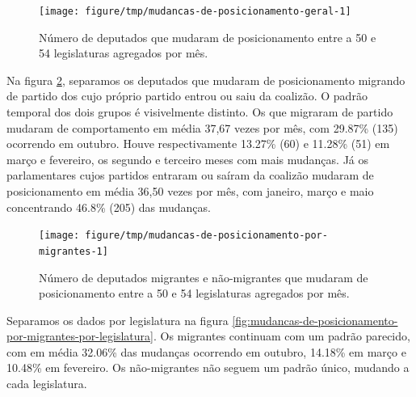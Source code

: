 \documentclass[a4paper,titlepage]{ppgi}\usepackage[]{graphicx}\usepackage[]{color}
\newenvironment{knitrout}{}{} %
\begin{document}
\begin{knitrout}
\color{fgcolor}\begin{figure}
\texttt{[image: figure/tmp/mudancas-de-posicionamento-geral-1]} \caption[Número de deputados que mudaram de posicionamento entre a 50\textordfeminine{} e 54\textordfeminine{} legislaturas agregados por mês]{Número de deputados que mudaram de posicionamento entre a 50\textordfeminine{} e 54\textordfeminine{} legislaturas agregados por mês.}\label{fig:mudancas-de-posicionamento-geral}
\end{figure}


\end{knitrout}

Na figura \ref{fig:mudancas-de-posicionamento-por-migrantes}, separamos os
deputados que mudaram de posicionamento migrando de partido dos cujo próprio
partido entrou ou saiu da coalizão. O padrão temporal dos dois grupos é
visivelmente distinto. Os que migraram de partido mudaram de comportamento em
média 37,67 vezes por mês, com
29.87\%
(135) ocorrendo em outubro. Houve respectivamente
13.27\%
(60) e
11.28\%
(51) em março e fevereiro, os segundo e terceiro
meses com mais mudanças. Já os parlamentares cujos partidos entraram ou saíram
da coalizão mudaram de posicionamento em média
36,50 vezes por mês, com janeiro, março e
maio concentrando
46.8\%
(205) das mudanças.

\begin{knitrout}
\color{fgcolor}\begin{figure}
\texttt{[image: figure/tmp/mudancas-de-posicionamento-por-migrantes-1]} \caption[Número de deputados migrantes e não-migrantes que mudaram de posicionamento entre a 50\textordfeminine{} e 54\textordfeminine{} legislaturas agregados por mês]{Número de deputados migrantes e não-migrantes que mudaram de posicionamento entre a 50\textordfeminine{} e 54\textordfeminine{} legislaturas agregados por mês.}\label{fig:mudancas-de-posicionamento-por-migrantes}
\end{figure}


\end{knitrout}

Separamos os dados por legislatura na figura
\ref{fig:mudancas-de-posicionamento-por-migrantes-por-legislatura}. Os
migrantes continuam com um padrão parecido, com em média
32.06\%
das mudanças ocorrendo em outubro,
14.18\%
em março e
10.48\%
em fevereiro. Os não-migrantes não seguem um padrão único, mudando a cada
legislatura.
\end{document}
